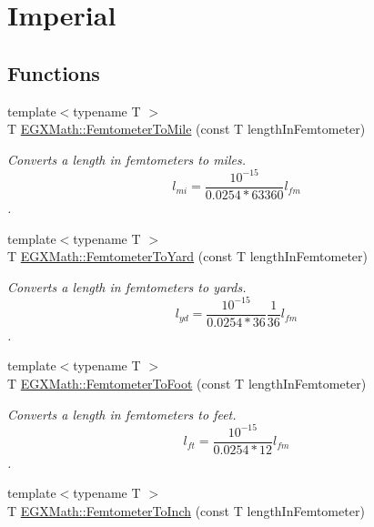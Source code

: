 \hypertarget{group___e_g_x_math-_conversions-_length_conversions-_s_i-_femtometer-_imperial}{}\section{Imperial}
\label{group___e_g_x_math-_conversions-_length_conversions-_s_i-_femtometer-_imperial}
\subsection*{Functions}
\begin{DoxyCompactItemize}
\item 
{\footnotesize template$<$typename T $>$ }\\T \mbox{\hyperlink{group___e_g_x_math-_conversions-_length_conversions-_s_i-_femtometer-_imperial_ga8973c4ada3a3bc89034978a0ba7c2693}{E\+G\+X\+Math\+::\+Femtometer\+To\+Mile}} (const T length\+In\+Femtometer)
\begin{DoxyCompactList}\small\item\em Converts a length in femtometers to miles. \[ l_{mi}=\frac{10^{-15}}{0.0254 * 63360} l_{fm} \]. \end{DoxyCompactList}\item 
{\footnotesize template$<$typename T $>$ }\\T \mbox{\hyperlink{group___e_g_x_math-_conversions-_length_conversions-_s_i-_femtometer-_imperial_ga4416c9d0cb07df4b86f23afe6b7f6e91}{E\+G\+X\+Math\+::\+Femtometer\+To\+Yard}} (const T length\+In\+Femtometer)
\begin{DoxyCompactList}\small\item\em Converts a length in femtometers to yards. \[ l_{yd}= \frac{10^{-15}}{0.0254 * 36} \frac{1}{36} l_{fm} \]. \end{DoxyCompactList}\item 
{\footnotesize template$<$typename T $>$ }\\T \mbox{\hyperlink{group___e_g_x_math-_conversions-_length_conversions-_s_i-_femtometer-_imperial_gaa33efbf3b5cee0874ad44736c0ac6fd2}{E\+G\+X\+Math\+::\+Femtometer\+To\+Foot}} (const T length\+In\+Femtometer)
\begin{DoxyCompactList}\small\item\em Converts a length in femtometers to feet. \[ l_{ft}= \frac{10^{-15}}{0.0254 * 12} l_{fm} \]. \end{DoxyCompactList}\item 
{\footnotesize template$<$typename T $>$ }\\T \mbox{\hyperlink{group___e_g_x_math-_conversions-_length_conversions-_s_i-_femtometer-_imperial_ga51c3107a7cfac96232eb0b040c3192a1}{E\+G\+X\+Math\+::\+Femtometer\+To\+Inch}} (const T length\+In\+Femtometer)

\end{DoxyCompactItemize}
